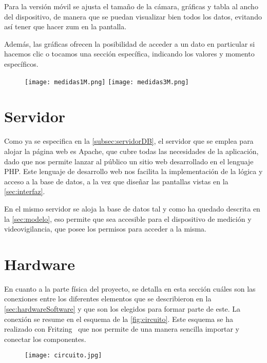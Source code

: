 Para la versión móvil se ajusta el tamaño de la cámara, gráficas y tabla al ancho del dispositivo, de manera que se puedan visualizar bien todos los datos, evitando así tener que hacer zum en la pantalla.
\pagebreak

Además, las gráficas ofrecen la posibilidad de acceder a un dato en particular si hacemos clic o tocamos una sección específica, indicando los valores y momento específicos.
\begin{figure}[H]
	{\texttt{[image: medidas1M.png]}
		\texttt{[image: medidas3M.png]}}
\end{figure}

\section{Servidor}\label{sec:servidor}
Como ya se especifica en la \autoref{subsec:servidorDB}, el servidor que se emplea para alojar la página web es Apache, que cubre todas las necesidades de la aplicación, dado que nos permite lanzar al público un sitio web desarrollado en el lenguaje PHP. Este lenguaje de desarrollo web nos facilita la implementación de la lógica y acceso a la base de datos, a la vez que diseñar las pantallas vistas en la \autoref{sec:interfaz}. 

En el mismo servidor se aloja la base de datos tal y como ha quedado descrita en la \autoref{sec:modelo}, eso permite que sea accesible para el dispositivo de medición y videovigilancia, que posee los permisos para acceder a la misma.
\pagebreak

\section{Hardware}\label{sec:hardware}
En cuanto a la parte física del proyecto, se detalla en esta sección cuáles son las conexiones entre los diferentes elementos que se describieron en la \autoref{sec:hardwareSoftware} y que son los elegidos para formar parte de este. La conexión se resume en el esquema de la \autoref{fig:circuito}. Este esquema se ha realizado con Fritzing~\cite{noauthor_fritzing_nodate} que nos permite de una manera sencilla importar y conectar los componentes.
\begin{figure}[H]
	{\texttt{[image: circuito.jpg]}}
\end{figure}

